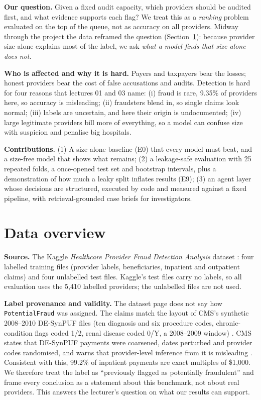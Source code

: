 \documentclass[11pt,a4paper]{article}
\begin{document}
\textbf{Our question.} Given a fixed audit capacity, which providers should be audited first, and what evidence supports each flag? We treat this as a \emph{ranking} problem evaluated on the top of the queue, not as accuracy on all providers. Midway through the project the data reframed the question (Section~\ref{sec:data}): because provider size alone explains most of the label, we ask \emph{what a model finds that size alone does not}.

\textbf{Who is affected and why it is hard.} Payers and taxpayers bear the losses; honest providers bear the cost of false accusations and audits. Detection is hard for four reasons that lectures 01 and 03 name: (i) fraud is rare, 9.35\% of providers here, so accuracy is misleading; (ii) fraudsters blend in, so single claims look normal; (iii) labels are uncertain, and here their origin is undocumented; (iv) large legitimate providers bill more of everything, so a model can confuse size with suspicion and penalise big hospitals.

\textbf{Contributions.} (1) A size-alone baseline (E0) that every model must beat, and a size-free model that shows what remains; (2) a leakage-safe evaluation with 25 repeated folds, a once-opened test set and bootstrap intervals, plus a demonstration of how much a leaky split inflates results (E9); (3) an agent layer whose decisions are structured, executed by code and measured against a fixed pipeline, with retrieval-grounded case briefs for investigators.

\section{Data overview}\label{sec:data}

\textbf{Source.} The Kaggle \emph{Healthcare Provider Fraud Detection Analysis} dataset \cite{kaggle}: four labelled training files (provider labels, beneficiaries, inpatient and outpatient claims) and four unlabelled test files. Kaggle's test files carry no labels, so all evaluation uses the 5,410 labelled providers; the unlabelled files are not used.

\textbf{Label provenance and validity.} The dataset page does not say how \texttt{PotentialFraud} was assigned. The claims match the layout of CMS's synthetic 2008--2010 DE-SynPUF files (ten diagnosis and six procedure codes, chronic-condition flags coded 1/2, renal disease coded 0/Y, a 2008--2009 window) \cite{synpuf}. CMS states that DE-SynPUF payments were coarsened, dates perturbed and provider codes randomised, and warns that provider-level inference from it is misleading \cite{synpufdug}. Consistent with this, 99.2\% of inpatient payments are exact multiples of \$1,000. We therefore treat the label as ``previously flagged as potentially fraudulent'' and frame every conclusion as a statement about this benchmark, not about real providers. This answers the lecturer's question on what our results can support.
\end{document}
